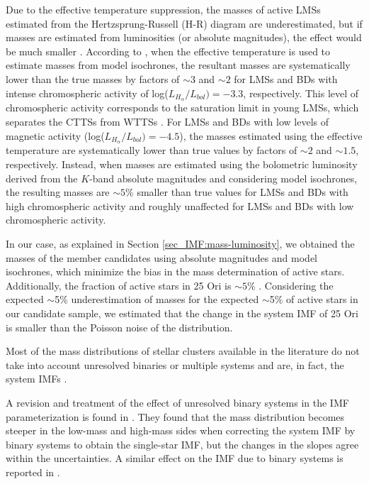 \documentclass[12pt]{article}
\newcounter{subsubsubsection}[subsubsection]
\begin{document}
Due to the effective temperature suppression, the masses of active LMSs estimated from the Hertzsprung-Russell (\ac{H-R}) diagram are underestimated, but if masses are estimated from luminosities (or absolute magnitudes), the effect would be much smaller \citep{Jeffries2017}. According to \citet{Stassun2012}, when the effective temperature is used to estimate masses from model isochrones, the resultant masses are systematically lower than the true masses by factors of $\sim3$ and $\sim2$ for LMSs and BDs with intense chromospheric activity of log($L_{H_\alpha}/L_{bol})=-3.3$, respectively. This level of chromospheric activity corresponds to the saturation limit in young LMSs, which separates the CTTSs from WTTSs \citep{BarradoYNavascues-Martin2003}. For LMSs and BDs with low levels of magnetic activity (log($L_{H_\alpha}/L_{bol})=-4.5$), the masses estimated using the effective temperature are systematically lower than true values by factors of $\sim2$ and $\sim1.5$, respectively. Instead, when masses are estimated using the bolometric luminosity derived from the $K$-band absolute magnitudes and considering model isochrones, the resulting masses are $\sim5$\% smaller than true values for LMSs and BDs with high chromospheric activity and roughly unaffected for LMSs and BDs with low chromospheric activity.

In our case, as explained in Section \ref{sec_IMF:mass-luminosity}, we obtained the masses of the member candidates using absolute magnitudes and model isochrones, which minimize the bias in the mass determination of active stars. Additionally, the fraction of active stars in 25 Ori is $\sim 5$\% \citep[][]{Briceno2005,Briceno2007,Hernandez2007a,Downes2014,Briceno2018}. Considering the expected $\sim$5\% underestimation of masses for the expected $\sim$5\% of active stars in our candidate sample, we estimated that the change in the system IMF of 25 Ori is smaller than the Poisson noise of the distribution.

Most of the mass distributions of stellar clusters available in the literature do not take into account unresolved binaries or multiple systems and are, in fact, the system IMFs \citep[e.g. Table \ref{tab_IMF:imf_literature} and ][]{Bastian2010}.

A revision and treatment of the effect of unresolved binary systems in the IMF parameterization is found in \citet{Muzic2017}. They found that the mass distribution becomes steeper in the low-mass and high-mass sides when correcting the system IMF by binary systems to obtain the single-star IMF, but the changes in the slopes agree within the uncertainties. A similar effect on the IMF due to binary systems is reported in \citet{Kroupa2001b}.
\end{document}
